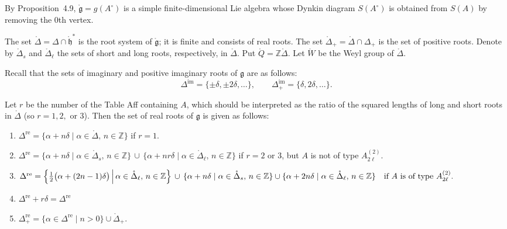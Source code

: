 \documentclass[12pt]{article}
\begin{document}
\medskip

\noindent By Proposition~4.9, $\mathring{\mathfrak{g}}=g(A^\circ)$ is a simple finite-dimensional Lie algebra whose Dynkin diagram $S(A^\circ)$ is obtained from $S(A)$ by removing the $0$th vertex. 

The set $\mathring{\Delta}=\Delta \cap \mathring{\mathfrak{h}}^*$ is the root system of $\mathring{\mathfrak{g}}$; it is finite and consists of real roots. The set $\mathring{\Delta}_+ = \mathring{\Delta} \cap \Delta_+$ is the set of positive roots. Denote by $\mathring{\Delta}_s$ and $\mathring{\Delta}_\ell$ the sets of short and long roots, respectively, in $\mathring{\Delta}$. Put $\mathring{Q} = \mathbb{Z}\mathring{\Delta}$. Let $\mathring{W}$ be the Weyl group of $\mathring{\Delta}$.

Recall that the sets of imaginary and positive imaginary roots of $\mathfrak{g}$ are as follows:
\[
\Delta^{\mathrm{im}} = \{\pm \delta, \pm 2\delta, \dots \}, 
\qquad 
\Delta^{\mathrm{im}}_+ = \{\delta, 2\delta, \dots\}.
\]

\begin{proposition}
\label{prop:real-roots-affine}
Let $r$ be the number of the Table Aff containing $A$, which should be interpreted as the ratio of the squared lengths of long and short roots in $\mathring{\Delta}$ (so $r=1,2,$ or $3$). Then the set of real roots of $\mathfrak{g}$ is given as follows:
\begin{enumerate}[label=\alph*)]
\item $\Delta^{\mathrm{re}} = \{\alpha+n\delta \mid \alpha\in \mathring{\Delta},\, n\in \mathbb{Z}\}$ \quad if $r=1$.
\item $\Delta^{\mathrm{re}} = \{\alpha+n\delta \mid \alpha\in \mathring{\Delta}_s,\, n\in \mathbb{Z}\} \,\cup\, \{\alpha+nr\delta \mid \alpha\in \mathring{\Delta}_\ell,\, n\in \mathbb{Z}\}$
if $r=2$ or $3$, but $A$ is not of type $A_{2\ell}^{(2)}$.
\item $\Delta^{\mathrm{re}} = \left\{ \tfrac{1}{2}\big(\alpha+(2n-1)\delta\big) \,\middle|\, \alpha\in \mathring{\Delta}_\ell,\, n\in \mathbb{Z} \right\} 
\,\cup\, \{\alpha+n\delta \mid \alpha\in \mathring{\Delta}_s,\, n\in \mathbb{Z}\} \\
\cup \{\alpha+2n\delta \mid \alpha\in \mathring{\Delta}_\ell,\, n\in \mathbb{Z}\}
\quad \text{if $A$ is of type $A_{2\ell}^{(2)}$.}$
\item $\Delta^{\mathrm{re}}+r\delta=\Delta^{\mathrm{re}}$
\item $\Delta^{\mathrm{re}}_+ = \{\alpha \in \Delta^{\mathrm{re}} \mid n>0\}\cup \mathring{\Delta}_+.$
\end{enumerate}
\end{proposition}
\end{document}
